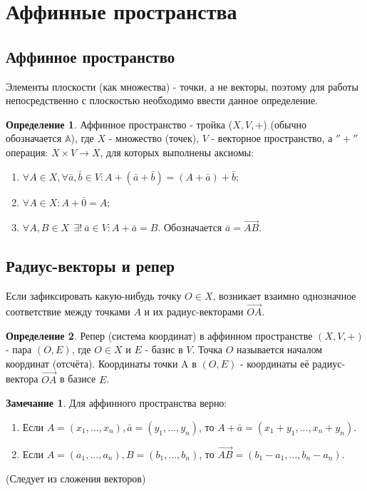 \documentclass[a4paper, 12pt]{article}
\theoremstyle{definition}
\newtheorem*{definition}{Определение}
\newtheorem*{remark}{Замечание}
\begin{document}
	\section{Аффинные пространства}
	\subsection{Аффинное пространство}
	Элементы плоскости (как множества) - точки, а не векторы, поэтому для работы непосредственно с плоскостью необходимо ввести данное определение.
	\begin{definition}
		Аффинное пространство - тройка ($X, V, +$) (обычно обозначается $\mathbb{A}$), где $X$ - множество (точек), $V$ - векторное пространство, а $''+''$ операция:  $X \times V \rightarrow X$, для которых выполнены аксиомы:
		\begin{enumerate}
			\item $\forall A \in X, \forall \bar{a}, \bar{b} \in V: A+(\bar{a}+\bar{b}) = (A+\bar{a})+\bar{b}$;
			\item $\forall A \in X: A + \bar{0} = A$;
			\item $\forall A, B \in X \ \ \exists! \ \bar{a} \in V: A + \bar{a} = B$. Обозначается $\bar{a} = \overrightarrow{AB}$.
		\end{enumerate}
	\end{definition}
	\subsection{Радиус-векторы и репер}
	Если зафиксировать какую-нибудь точку $O \in X$, возникает взаимно однозначное соответствие между точками $A$ и их радиус-векторами $\overrightarrow{OA}$.
	\begin{definition}
		Репер (система координат) в аффинном пространстве $(X, V, +)$ - пара $(O, E)$, где $O \in X$ и $E$ - базис в $V$. Точка $O$ называется началом координат (отсчёта). Координаты точки A в $(O, E)$ - координаты её радиус-вектора $\overrightarrow{OA}$ в базисе $E$.
	\end{definition}
	\begin{remark}
		Для аффинного пространства верно:
		\begin{enumerate}
			\item Если $A = (x_{1},...,x_{n}),  \bar{a} = (y_{1},...,y_{n})$, то $A + \bar{a} = (x_{1} + y_{1},...,x_{n} + y_{n})$.
			\item Если $A = (a_{1},...,a_{n}),  B = (b_{1},...,b_{n})$, то $\overrightarrow{AB} = (b_{1} - a_{1},...,b_{n} - a_{n})$.
		\end{enumerate}
		(Следует из сложения векторов)
	\end{remark}
\end{document}
